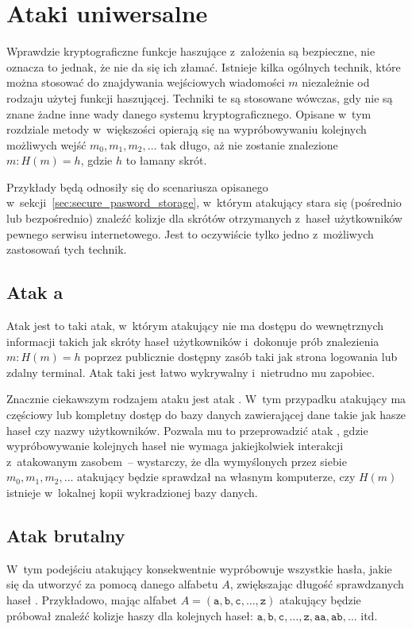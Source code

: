 \section{Ataki uniwersalne}
\label{sec:universal_attacks}%
Wprawdzie kryptograficzne funkcje haszujące z~założenia są bezpieczne, nie
oznacza to jednak, że nie da się ich złamać. Istnieje kilka ogólnych technik,
które można stosować do znajdywania wejściowych wiadomości $m$ niezależnie od
rodzaju użytej funkcji haszującej. Techniki te są stosowane wówczas, gdy nie są
znane żadne inne wady danego systemu kryptograficznego. Opisane w~tym rozdziale
metody w~większości opierają się na wypróbowywaniu kolejnych możliwych wejść
$m_0, m_1, m_2, \ldots$ tak długo, aż nie zostanie znalezione $m : H(m) = h$,
gdzie $h$ to łamany skrót.

Przykłady będą odnosiły się do scenariusza opisanego
w~sekcji~\ref{sec:secure_pasword_storage}, w~którym atakujący stara się
(pośrednio lub bezpośrednio) znaleźć kolizje dla skrótów otrzymanych z~haseł
użytkowników pewnego serwisu internetowego. Jest to oczywiście tylko jedno
z~możliwych zastosowań tych technik.



\subsection{Atak  a~}
Atak  jest to taki atak, w~którym atakujący nie ma dostępu do
wewnętrznych informacji takich jak skróty haseł użytkowników i~dokonuje prób
znalezienia \mbox{$m : H(m) = h$} poprzez publicznie dostępny zasób taki jak
strona logowania lub zdalny terminal. Atak taki jest łatwo wykrywalny
i~nietrudno mu zapobiec.

Znacznie ciekawszym rodzajem ataku jest atak . W~tym przypadku
atakujący ma częściowy lub kompletny dostęp do bazy danych zawierającej dane
takie jak hasze haseł czy nazwy użytkowników. Pozwala mu to przeprowadzić atak
, gdzie wypróbowywanie kolejnych haseł nie wymaga jakiejkolwiek
interakcji z~atakowanym zasobem~-- wystarczy, że dla wymyślonych przez siebie
$m_0, m_1, m_2, \ldots$ atakujący będzie sprawdzał na własnym komputerze, czy
$H(m)$ istnieje w~lokalnej kopii wykradzionej bazy danych.



\subsection{Atak brutalny}
W~tym podejściu atakujący konsekwentnie wypróbowuje wszystkie hasła, jakie się
da utworzyć za pomocą danego alfabetu $A$, zwiększając długość sprawdzanych
haseł . Przykładowo, mając alfabet $A=(\mathtt{a},
\mathtt{b}, \mathtt{c}, \ldots, \mathtt{z})$ atakujący będzie próbował znaleźć
kolizje haszy dla kolejnych haseł: $\mathtt{a}, \mathtt{b}, \mathtt{c}, \ldots,
\mathtt{z}, \mathtt{aa}, \mathtt{ab}, \ldots$ itd.

